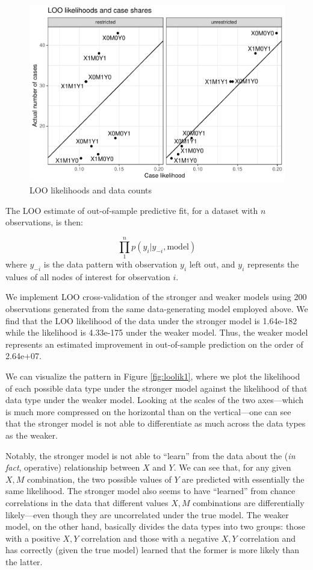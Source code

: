 \documentclass[
  12pt,
]{book}
\begin{document}
\begin{figure}

{\centering \includegraphics{ii_files/figure-latex/loolik2-1} 

}

\caption{LOO likelihoods and data counts}\label{fig:loolik2}
\end{figure}

The LOO estimate of out-of-sample predictive fit, for a dataset with \(n\) observations, is then:

\[\prod_1^np(y_i|y_{-i}, \text{model})\]
where \(y_{-i}\) is the data pattern with observation \(y_i\) left out, and \(y_i\) represents the values of all nodes of interest for observation \(i\).

We implement LOO cross-validation of the stronger and weaker models using 200 observations generated from the same data-generating model employed above. We find that the LOO likelihood of the data under the stronger model is 1.64e-182 while
the likelihood is 4.33e-175 under the weaker model. Thus, the weaker model represents an estimated improvement in out-of-sample prediction on the order of 2.64e+07.

We can visualize the pattern in Figure \ref{fig:loolik1}, where we plot the likelihood of each possible data type under the stronger model against the likelihood of that data type under the weaker model. Looking at the scales of the two axes---which is much more compressed on the horizontal than on the vertical---one can see that the stronger model is not able to differentiate as much across the data types as the weaker.

Notably, the stronger model is not able to ``learn'' from the data about the (\emph{in fact}, operative) relationship between \(X\) and \(Y\). We can see that, for any given \(X, M\) combination, the two possible values of \(Y\) are predicted with essentially the same likelihood. The stronger model also seems to have ``learned'' from chance correlations in the data that different values \(X,M\) combinations are differentially likely---even though they are uncorrelated under the true model. The weaker model, on the other hand, basically divides the data types into two groups: those with a positive \(X,Y\) correlation and those with a negative \(X,Y\) correlation and has correctly (given the true model) learned that the former is more likely than the latter.
\end{document}
